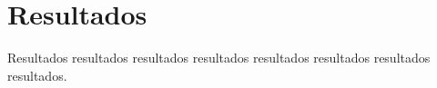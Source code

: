 
\section{Resultados}
\label{chapter:secao3}

Resultados resultados resultados resultados resultados resultados resultados resultados.
